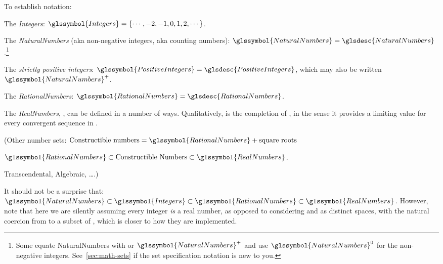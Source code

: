 \label{sec:Numbers}

% 


\lstset{language=Clojure}

To establish notation:

The \textit{\gls{Integers}}: 
$\glssymbol{Integers} = \{\cdots, -2, -1, 0, 1, 2, \cdots\}$.

The \textit{\gls{NaturalNumbers}} (aka non-negative integers, aka counting
numbers):
$\glssymbol{NaturalNumbers} = \glsdesc{NaturalNumbers}$.\footnote{ 
Some
equate \gls{NaturalNumbers} with  
or $\glssymbol{NaturalNumbers}^{+}$ and use
$\glssymbol{NaturalNumbers}^{0}$ for the non-negative integers. 
See~\autoref{sec:math-sets} if the set specification
notation is new to you.}

The \textit{strictly positive integers}: 
$\glssymbol{PositiveIntegers} = \glsdesc{PositiveIntegers}$, which 
may also be written $\glssymbol{NaturalNumbers}^{+}$.

The \textit{\gls{RationalNumbers}}: 
$\glssymbol{RationalNumbers} = \glsdesc{RationalNumbers}$.

The \textit{\gls{RealNumbers}}, ,
can be defined in a number of ways. 
Qualitatively,  is the completion of
, in the sense it provides a limiting value for every
convergent sequence in .

(Other number sets:
$\text{Constructible numbers} = \glssymbol{RationalNumbers}
+ \text{square roots}$

$\glssymbol{RationalNumbers}
\subset 
\text{Constructible Numbers}
\subset 
\glssymbol{RealNumbers}$.

Transcendental, Algebraic, \ldots.)

It should not be a surprise that:
$\glssymbol{NaturalNumbers} 
\subset 
\glssymbol{Integers}
\subset 
\glssymbol{RationalNumbers}
\subset 
\glssymbol{RealNumbers}$.
However, note that here we are silently assuming every integer
\emph{is} a real number, as opposed to considering  and
 as distinct spaces, with the natural coercion
from  to a subset of ,
which is closer to how they are implemented.

